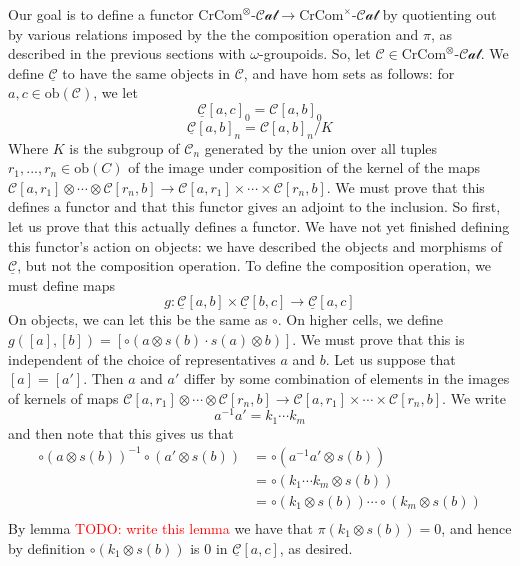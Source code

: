 \documentclass[12pt]{article}
\theoremstyle{definition}
\newcommand{\TODO}[1]{\textcolor{red}{TODO: {#1}}}
\newcommand{\C}{\mathcal{C}}
\newcommand{\crcom}{\text{CrCom}}
\newcommand{\cartcrossedcat}{\crcom^\times\text{-}\mathcal{Cat}}
\newcommand{\tensorcrossedcat}{\crcom^\otimes\text{-}\mathcal{Cat}}
\newcommand{\tencart}[1]{\underline{#1}}
\newcommand{\ob}{\text{ob}}
\begin{document}
Our goal is to define a functor $\tensorcrossedcat \to \cartcrossedcat$ by quotienting out by various relations imposed by the the composition operation and $\pi$, as described in the previous sections with $\omega$-groupoids. So, let $\C \in \tensorcrossedcat$. 
We define $\tencart{\C}$ to have the same objects in $\C$, and have hom sets as follows: for $a,c \in \ob(\C)$, we let 
$$
\tencart{\C}[a,c]_0 = \C[a,b]_0
$$
$$\tencart{\C}[a,b]_n = \C[a,b]_n/K$$
Where $K$ is the subgroup of $\C_n$ generated by the union over all tuples $r_1,...,r_n \in \ob(C)$ of the image under composition of the kernel of the maps $\C[a,r_1] \otimes \cdots \otimes \C[r_n,b] \to \C[a,r_1] \times \cdots \times \C[r_n,b]$. We must prove that this defines a functor and that this functor gives an adjoint to the inclusion. 
So first, let us prove that this actually defines a functor. 
We have not yet finished defining this functor's action on objects: we have described the objects and morphisms of $\tencart{\C}$, but not the composition operation. To define the composition operation, we must define maps 
$$g: \tencart{\C}[a,b] \times \tencart{\C}[b,c] \to \tencart{\C}[a,c]$$
On objects, we can let this be the same as $\circ$. On higher cells, we define $g([a],[b]) = [\circ(a\otimes s(b) \cdot s(a) \otimes b)]$. 
We must prove that this is independent of the choice of representatives $a$ and $b$. Let us suppose that $[a] = [a']$. 
Then $a$ and $a'$ differ by some combination of elements in the images of kernels of maps $\C[a,r_1] \otimes \cdots \otimes \C[r_n,b] \to \C[a,r_1] \times \cdots \times \C[r_n,b]$. We write
$$a^{-1}a' = k_1 \cdots k_m$$
and then note that this gives us that 
\begin{align*}
	\circ(a \otimes s(b))^{-1} \circ(a' \otimes s(b)) &= \circ(a^{-1} a' \otimes s(b)) \\
	&= \circ(k_1 \cdots k_m \otimes s(b)) \\
	&= \circ(k_1 \otimes s(b)) \cdots \circ (k_m \otimes s(b)) \\
\end{align*}
By lemma \TODO{write this lemma} we have that $\pi(k_1 \otimes s(b)) = 0$, and hence by definition $\circ(k_1 \otimes s(b))$ is $0$ in $\tencart{\C}[a,c]$, as desired. 
%
\end{document}
